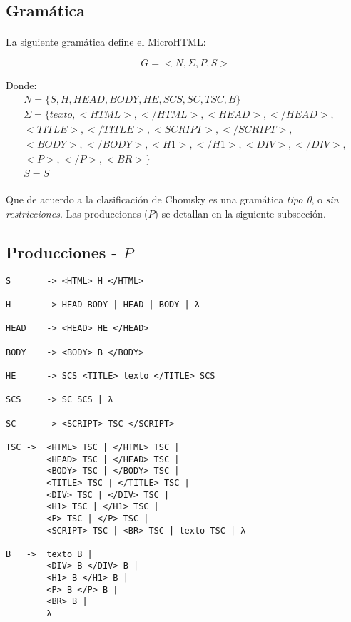 \subsection{Gram\'atica}
\label{sec:gramatica}
\paragraph{} La siguiente gram\'atica define el MicroHTML:

\[
    G = <N, \Sigma, P, S>
\]

Donde:
\begin{gather*}
    N = \{S, H, HEAD, BODY, HE, SCS, SC, TSC, B\}\\
    \Sigma = \{texto, <HTML>, </HTML>, <HEAD>, </HEAD>, \\
               <TITLE>, </TITLE>, <SCRIPT>, </SCRIPT>, \\
               <BODY>, </BODY>, <H1>, </H1>, <DIV>, </DIV>,\\
               <P>, </P>, <BR>\}\\
    S = S
\end{gather*}

\paragraph{} Que de acuerdo a la clasificaci\'on de Chomsky es una gram\'atica \emph{tipo 0}, o \emph{sin restricciones}. Las producciones ($P$) se detallan en la siguiente subsecci\'on.

\subsection{Producciones - $P$}
\begin{lstlisting}
S       -> <HTML> H </HTML>
 
H       -> HEAD BODY | HEAD | BODY | λ   

HEAD    -> <HEAD> HE </HEAD>

BODY    -> <BODY> B </BODY>

HE      -> SCS <TITLE> texto </TITLE> SCS 

SCS     -> SC SCS | λ

SC      -> <SCRIPT> TSC </SCRIPT>

TSC ->  <HTML> TSC | </HTML> TSC | 
        <HEAD> TSC | </HEAD> TSC |
        <BODY> TSC | </BODY> TSC |
        <TITLE> TSC | </TITLE> TSC |
        <DIV> TSC | </DIV> TSC |
        <H1> TSC | </H1> TSC |
        <P> TSC | </P> TSC |
        <SCRIPT> TSC | <BR> TSC | texto TSC | λ

B   ->  texto B |
        <DIV> B </DIV> B |
        <H1> B </H1> B |
        <P> B </P> B |
        <BR> B |
        λ

\end{lstlisting}


